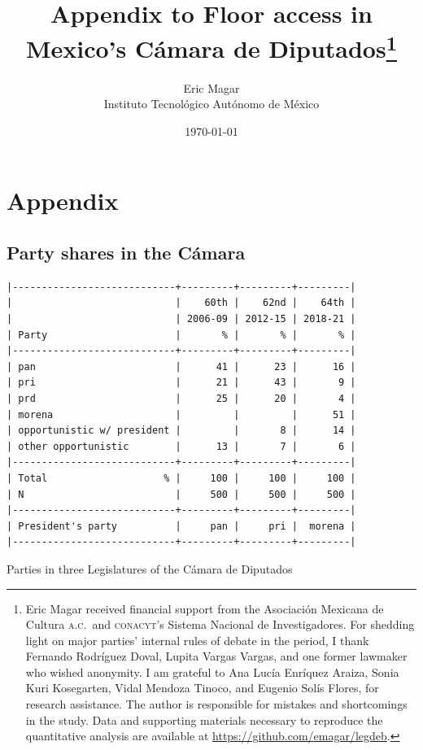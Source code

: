 \documentclass[letter,12pt]{article}
\begin{document}
\title{Appendix to Floor access in Mexico's Cámara de Diputados\thanks{Eric Magar received financial support from the Asociaci\'on Mexicana de Cultura \textsc{a.c.}\ and \textsc{conacyt}'s Sistema Nacional de Investigadores. For shedding light on major parties' internal rules of debate in the period, I thank Fernando Rodríguez Doval, Lupita Vargas Vargas, and one former lawmaker who wished anonymity. I am grateful to Ana Lucía Enríquez Araiza, Sonia Kuri Kosegarten, Vidal Mendoza Tinoco, and Eugenio Solís Flores, for research assistance. The author is responsible for mistakes and shortcomings in the study. Data and supporting materials necessary to reproduce the quantitative analysis are available at \url{https://github.com/emagar/legdeb}.}}
\author{Eric Magar \\ Instituto Tecnológico Autónomo de México}
\date{\today}
\maketitle

\newpage

\doublespacing

\section{Appendix}

\subsection{Party shares in the Cámara}

\begin{table}
\begin{scriptsize}
\begin{verbatim}
|----------------------------+---------+---------+---------|
|                            |    60th |    62nd |    64th |
|                            | 2006-09 | 2012-15 | 2018-21 |
| Party                      |       % |       % |       % |
|----------------------------+---------+---------+---------|
| pan                        |      41 |      23 |      16 |
| pri                        |      21 |      43 |       9 |
| prd                        |      25 |      20 |       4 |
| morena                     |         |         |      51 |
| opportunistic w/ president |         |       8 |      14 |
| other opportunistic        |      13 |       7 |       6 |
|----------------------------+---------+---------+---------|
| Total                    % |     100 |     100 |     100 |
| N                          |     500 |     500 |     500 |
|----------------------------+---------+---------+---------|
| President's party          |     pan |     pri |  morena |
|----------------------------+---------+---------+---------|
\end{verbatim}
\end{scriptsize}
\caption{Parties in three Legislatures of the Cámara de Diputados}\label{T:seats}
\end{table}
\end{document}
